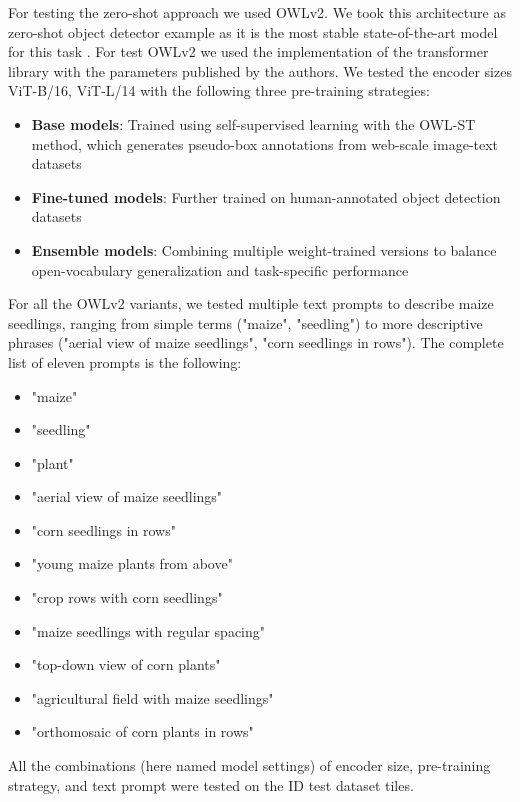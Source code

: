 \documentclass[12pt,a4paper,oneside]{report}
\begin{document}
For testing the zero-shot approach we used OWLv2.
We took this architecture as zero-shot object detector example as it is the most stable 
state-of-the-art model for this task \cite{mindererScalingOpenVocabularyObject2023,liuGroundingDINOMarrying2025}.
For test OWLv2 we used the implementation of the transformer library \cite{wolfTransformersStateoftheArtNatural2020}
with the parameters published by the authors.
We tested the encoder sizes ViT-B/16, ViT-L/14 with the following three pre-training 
strategies:

\begin{itemize}
    \item \textbf{Base models}: Trained using self-supervised learning with the OWL-ST method, which generates pseudo-box annotations from web-scale image-text datasets
    \item \textbf{Fine-tuned models}: Further trained on human-annotated object detection datasets
    \item \textbf{Ensemble models}: Combining multiple weight-trained versions to balance open-vocabulary generalization and task-specific performance
\end{itemize}

For all the OWLv2 variants, we tested multiple text prompts to describe maize seedlings, 
ranging from simple terms ("maize", "seedling") to more descriptive phrases 
("aerial view of maize seedlings", "corn seedlings in rows"). The complete list of 
eleven prompts is the following: 
\begin{itemize}
    \item "maize"
    \item "seedling"
    \item "plant"
    \item "aerial view of maize seedlings"
    \item "corn seedlings in rows"
    \item "young maize plants from above"
    \item "crop rows with corn seedlings"
    \item "maize seedlings with regular spacing"
    \item "top-down view of corn plants"
    \item "agricultural field with maize seedlings"
    \item "orthomosaic of corn plants in rows"
\end{itemize}
All the combinations (here named model 
settings) of encoder size, pre-training strategy, and text prompt were tested on the 
ID test dataset tiles.
\end{document}
